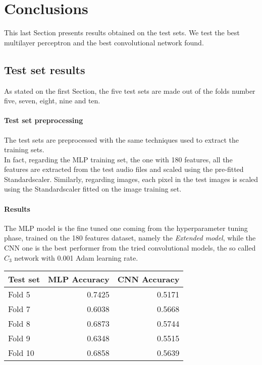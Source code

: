 \section{Conclusions}
\label{results}

This last Section presents results obtained on the test sets. 
We test the best multilayer perceptron and the best convolutional network found.

\subsection{Test set results}
As stated on the first Section, the five test sets are made out of the 
folds number five, seven, eight, nine and ten.

\paragraph{Test set preprocessing}
The test sets are preprocessed with the same techniques used to extract the training sets.\\
In fact, regarding the MLP training set, the one with 180 features, all the features are extracted 
from the test audio files and scaled using the pre-fitted Standardscaler.
Similarly, regarding images, each pixel in the test images is scaled using the Standardscaler 
fitted on the image training set.

\paragraph{Results}
The MLP model is the fine tuned one coming from the hyperparameter tuning phase, 
trained on the 180 features dataset, namely the \emph{Extended model}, 
while the CNN one is the best performer from the tried convolutional models, 
the so called $C_3$ network with 0.001 Adam learning rate.
\begin{center}
    \begin{tabular}{ |l|r|r| } 
        \hline
        Test set & MLP Accuracy & CNN Accuracy\\
        \hline
        Fold 5 & 0.7425 & 0.5171\\
        Fold 7 & 0.6038 & 0.5668\\
        Fold 8 & 0.6873 & 0.5744\\
        Fold 9 & 0.6348 & 0.5515\\
        Fold 10 & 0.6858 & 0.5639\\ 
        \hline
    \end{tabular}
\end{center}

